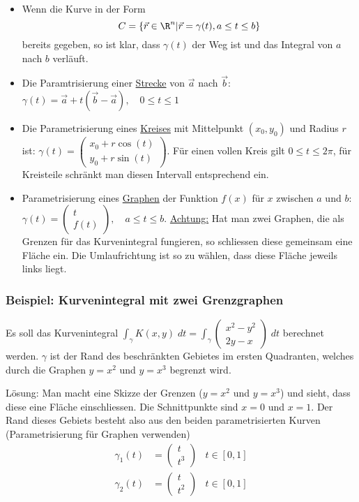 \begin{itemize}[leftmargin=*]
	\item Wenn die Kurve in der Form
	\[
	C = \{\vec{r} \in \R^n | \vec{r} = \gamma(t), a \leq t \leq b\}
	\]
	bereits gegeben, so ist klar, dass $\gamma(t)$ der Weg ist und das Integral von
	$a$ nach $b$ verläuft.
	
	\item Die Paramtrisierung einer \underline{Strecke} von $\vec{a}$ nach $\vec{b}$:
	$\gamma(t) = \vec{a} + t(\vec{b}-\vec{a}), \quad 0 \leq t \leq 1$
	
	\item Die Parametrisierung eines \underline{Kreises} mit Mittelpunkt $(x_0, y_0)$ und
	Radius $r$ ist: $\gamma(t) =
	\begin{pmatrix}
	x_0 + r \cos(t)\\
	y_0 + r \sin(t)
	\end{pmatrix}$. Für einen vollen Kreis gilt $0 \leq t \leq 2\pi$, für Kreisteile
	schränkt man diesen Intervall entsprechend ein.
	
	\item Parametrisierung eines \underline{Graphen} der Funktion $f(x)$ für $x$
	zwischen $a$ und $b$: $\gamma(t) =
	\begin{pmatrix}
	t\\
	f(t)
	\end{pmatrix}, \quad a \leq t \leq b$. \underline{Achtung:} Hat man zwei
	Graphen, die als Grenzen für das Kurvenintegral fungieren, so schliessen diese
	gemeinsam eine Fläche ein. Die Umlaufrichtung ist so zu wählen, dass diese
	Fläche jeweils links liegt.
\end{itemize}

\subsubsection{Beispiel: Kurvenintegral mit zwei Grenzgraphen}
Es soll das Kurvenintegral $\int_\gamma K(x,y)\;dt = \int_\gamma
\begin{pmatrix}
x^2 - y^2\\
2y -x
\end{pmatrix}\;dt$ berechnet werden. $\gamma$ ist der Rand des beschränkten
Gebietes im ersten Quadranten, welches durch die Graphen $y=x^2$ und $y=x^3$ begrenzt
wird.

Lösung: Man macht eine Skizze der Grenzen ($y=x^2$ und $y=x^3$) und sieht, dass
diese eine Fläche einschliessen. Die Schnittpunkte sind $x = 0$ und $x = 1$. Der
Rand dieses Gebiets besteht also aus den beiden parametrisierten Kurven
(Parametrisierung für Graphen verwenden)
\begin{align*}
\gamma_1(t) &= \begin{pmatrix}t\\t^3\end{pmatrix} & t \in [0,1]\\
\gamma_2(t) &= \begin{pmatrix}t\\t^2\end{pmatrix} & t \in [0,1]
\end{align*}

